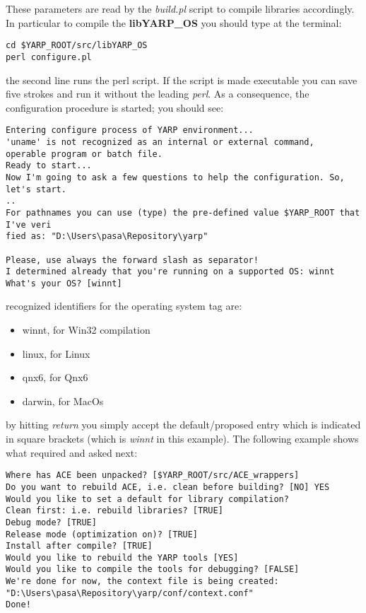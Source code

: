 These parameters are read by the {\em build.pl} script to compile libraries accordingly. In particular to compile the {\bf libYARP\_OS} you should type at the terminal:

\begin{verbatim}
cd $YARP_ROOT/src/libYARP_OS
perl configure.pl
\end{verbatim}

the second line runs the perl script. If the script is made executable you can save five strokes and run it without the leading {\em perl}. As a consequence, the configuration procedure is started; you should see:

\begin{verbatim}
Entering configure process of YARP environment...
'uname' is not recognized as an internal or external command,
operable program or batch file.
Ready to start...
Now I'm going to ask a few questions to help the configuration. So, let's start.
..
For pathnames you can use (type) the pre-defined value $YARP_ROOT that I've veri
fied as: "D:\Users\pasa\Repository\yarp"

Please, use always the forward slash as separator!
I determined already that you're running on a supported OS: winnt
What's your OS? [winnt]
\end{verbatim}

recognized identifiers for the operating system tag are:
\begin{itemize}
\item winnt, for Win32 compilation
\item linux, for Linux
\item qnx6, for Qnx6
\item darwin, for MacOs
\end{itemize}

by hitting {\em return} you simply accept the default/proposed entry which is indicated in square brackets (which is {\em winnt} in this example). The following example shows what required and asked next:

\begin{verbatim}
Where has ACE been unpacked? [$YARP_ROOT/src/ACE_wrappers]
Do you want to rebuild ACE, i.e. clean before building? [NO] YES
Would you like to set a default for library compilation?
Clean first: i.e. rebuild libraries? [TRUE]
Debug mode? [TRUE]
Release mode (optimization on)? [TRUE]
Install after compile? [TRUE]
Would you like to rebuild the YARP tools [YES]
Would you like to compile the tools for debugging? [FALSE]
We're done for now, the context file is being created: 
"D:\Users\pasa\Repository\yarp/conf/context.conf"
Done!
\end{verbatim}


